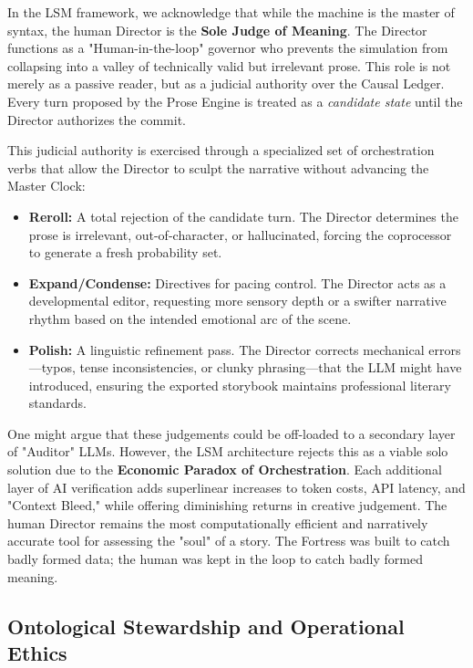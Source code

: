 \documentclass[12pt, a4paper]{article}
\begin{document}
In the LSM framework, we acknowledge that while the machine is the master of syntax, the human Director is the \textbf{Sole Judge of Meaning}. The Director functions as a "Human-in-the-loop" governor who prevents the simulation from collapsing into a valley of technically valid but irrelevant prose. This role is not merely as a passive reader, but as a judicial authority over the Causal Ledger. Every turn proposed by the Prose Engine is treated as a \textit{candidate state} until the Director authorizes the commit.

This judicial authority is exercised through a specialized set of orchestration verbs that allow the Director to sculpt the narrative without advancing the Master Clock:
\begin{itemize}
    \item \textbf{Reroll:} A total rejection of the candidate turn. The Director determines the prose is irrelevant, out-of-character, or hallucinated, forcing the coprocessor to generate a fresh probability set.
    \item \textbf{Expand/Condense:} Directives for pacing control. The Director acts as a developmental editor, requesting more sensory depth or a swifter narrative rhythm based on the intended emotional arc of the scene.
    \item \textbf{Polish:} A linguistic refinement pass. The Director corrects mechanical errors---typos, tense inconsistencies, or clunky phrasing---that the LLM might have introduced, ensuring the exported storybook maintains professional literary standards.
\end{itemize}

One might argue that these judgements could be off-loaded to a secondary layer of "Auditor" LLMs. However, the LSM architecture rejects this as a viable solo solution due to the \textbf{Economic Paradox of Orchestration}. Each additional layer of AI verification adds superlinear increases to token costs, API latency, and "Context Bleed," while offering diminishing returns in creative judgement. The human Director remains the most computationally efficient and narratively accurate tool for assessing the "soul" of a story. The Fortress was built to catch badly formed data; the human was kept in the loop to catch badly formed meaning.

\subsection{Ontological Stewardship and Operational Ethics}
\end{document}
